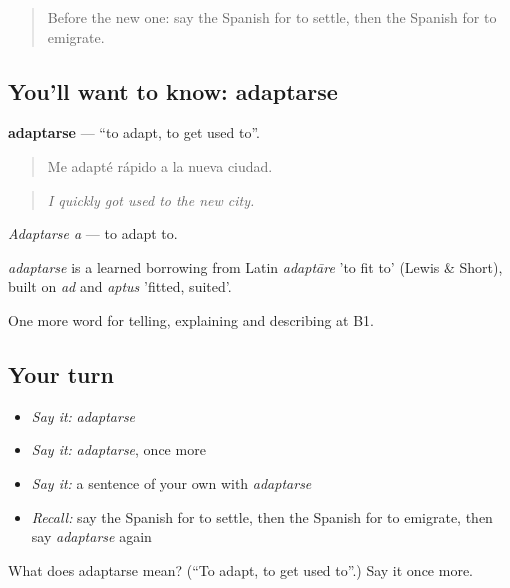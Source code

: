 \label{lesson:ES-C551-adaptarse}



\begin{quote}
Before the new one: say the Spanish for to settle, then the Spanish for to emigrate.
\end{quote}

\subsection*{You'll want to know: adaptarse}
\textbf{adaptarse} — \textquotedblleft{}to adapt, to get used to\textquotedblright{}.

\begin{quote}
Me adapté rápido a la nueva ciudad.
\end{quote}

\begin{quote}
\emph{I quickly got used to the new city.}
\end{quote}

\emph{Adaptarse a} — to adapt to.

\begin{cousinweb}
\emph{adaptarse} is a learned borrowing from Latin \emph{adaptāre} 'to fit to' (Lewis \& Short), built on \emph{ad} and \emph{aptus} 'fitted, suited'.
\end{cousinweb}

\begin{grammarlens}[title={What you've built}]
One more word for telling, explaining and describing at B1.
\end{grammarlens}

\subsection*{Your turn}
\begin{itemize}
\raggedright
  \item \emph{Say it:} \emph{adaptarse}
  \item \emph{Say it:} \emph{adaptarse}, once more
  \item \emph{Say it:} a sentence of your own with \emph{adaptarse}
  \item \emph{Recall:} say the Spanish for to settle, then the Spanish for to emigrate, then say \emph{adaptarse} again
\end{itemize}

\begin{tcolorbox}[breakable,colback=teal!4,colframe=teal!35!black,title={Before you move on}]
What does adaptarse mean? (\textquotedblleft{}To adapt, to get used to\textquotedblright{}.) Say it once more.
\end{tcolorbox}
